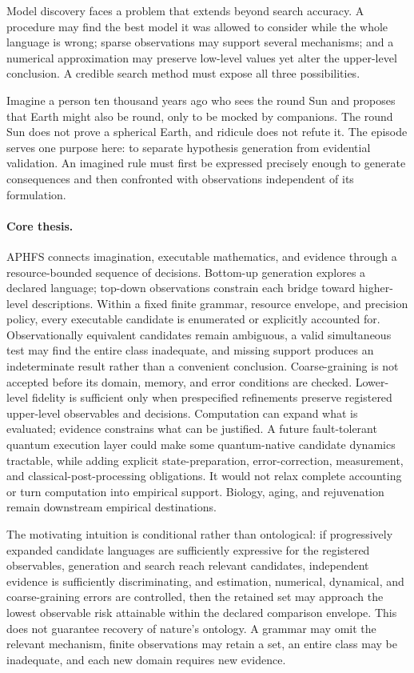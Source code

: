 \documentclass[10pt]{article}
\theoremstyle{definition}
\begin{document}
Model discovery faces a problem that extends beyond search accuracy. A procedure may find the
best model it was allowed to consider while the whole language is wrong; sparse observations may
support several mechanisms; and a numerical approximation may preserve low-level values yet alter
the upper-level conclusion. A credible search method must expose all three possibilities.

Imagine a person ten thousand years ago who sees the round Sun and proposes that Earth might also
be round, only to be mocked by companions. The round Sun does not prove a spherical Earth, and
ridicule does not refute it. The episode serves one purpose here: to separate hypothesis
generation from evidential validation. An imagined rule must first be expressed precisely enough
to generate consequences and then confronted with observations independent of its formulation.

\paragraph{Core thesis.}
APHFS connects imagination, executable mathematics, and evidence through a resource-bounded
sequence of decisions. Bottom-up generation explores a declared language; top-down observations
constrain each bridge toward higher-level descriptions. Within a fixed finite grammar, resource
envelope, and precision policy, every executable candidate is enumerated or explicitly accounted
for. Observationally equivalent candidates remain ambiguous, a valid simultaneous test may find
the entire class inadequate, and missing support produces an indeterminate result rather than a
convenient conclusion. Coarse-graining is not accepted before its domain, memory, and error
conditions are checked. Lower-level fidelity is sufficient only when prespecified refinements
preserve registered upper-level observables and decisions. Computation can expand what is
evaluated; evidence constrains what can be justified. A future fault-tolerant quantum execution
layer could make some quantum-native candidate dynamics tractable, while adding explicit
state-preparation, error-correction, measurement, and classical-post-processing obligations. It
would not relax complete accounting or turn computation into empirical support. Biology, aging,
and rejuvenation remain downstream empirical destinations.

The motivating intuition is conditional rather than ontological: if progressively expanded
candidate languages are sufficiently expressive for the registered observables, generation and
search reach relevant candidates, independent evidence is sufficiently discriminating, and
estimation, numerical, dynamical, and coarse-graining errors are controlled, then the retained set
may approach the lowest observable risk attainable within the declared comparison envelope. This
does not guarantee recovery of nature's ontology. A grammar may omit the relevant mechanism,
finite observations may retain a set, an entire class may be inadequate, and each new domain
requires new evidence.
\end{document}
